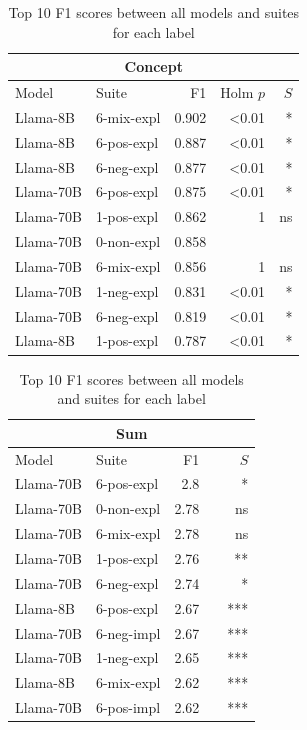 \begin{table}
    \begin{tabular}{ll|rrr}
    \toprule
    \multicolumn{5}{c}{\textbf{Concept}} \\
    \midrule
    Model & Suite & F1 & Holm $p$ & $S$ \\
    \midrule
    Llama-8B & 6-mix-expl & 0.902 & <0.01 & * \\
    Llama-8B & 6-pos-expl & 0.887 & <0.01 & * \\
    Llama-8B & 6-neg-expl & 0.877 & <0.01 & * \\
    Llama-70B & 6-pos-expl & 0.875 & <0.01 & * \\
    Llama-70B & 1-pos-expl & 0.862 & 1 & ns \\
    Llama-70B & 0-non-expl & 0.858 &  &  \\
    Llama-70B & 6-mix-expl & 0.856 & 1 & ns \\
    Llama-70B & 1-neg-expl & 0.831 & <0.01 & * \\
    Llama-70B & 6-neg-expl & 0.819 & <0.01 & * \\
    Llama-8B & 1-pos-expl & 0.787 & <0.01 & * \\
    \bottomrule
    \end{tabular}
    \begin{tabular}{ll|rrr}
    \toprule
    \multicolumn{5}{c}{\textbf{Sum}} \\
    \midrule
    Model & Suite & F1 & \phantom{Holm $p$} & $S$ \\
    \midrule
    Llama-70B & 6-pos-expl & 2.8 &  & * \\
    Llama-70B & 0-non-expl & 2.78 &  & ns \\
    Llama-70B & 6-mix-expl & 2.78 &  & ns \\
    Llama-70B & 1-pos-expl & 2.76 &  & ** \\
    Llama-70B & 6-neg-expl & 2.74 &  & * \\
    Llama-8B & 6-pos-expl & 2.67 &  & *** \\
    Llama-70B & 6-neg-impl & 2.67 &  & *** \\
    Llama-70B & 1-neg-expl & 2.65 &  & *** \\
    Llama-8B & 6-mix-expl & 2.62 &  & *** \\
    Llama-70B & 6-pos-impl & 2.62 &  & *** \\
    \bottomrule
    \end{tabular}
    \caption{Top 10 F1 scores between all models and suites for each label}
    \label{tab:top10s}
\end{table}